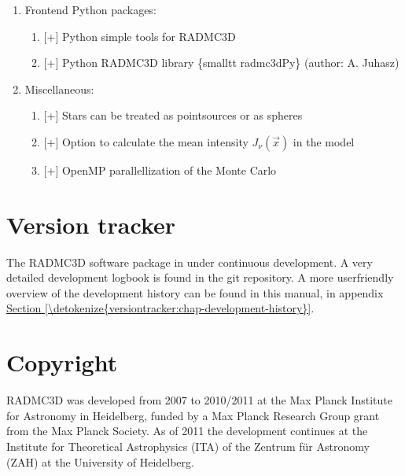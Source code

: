 \documentclass[letterpaper,10pt,english]{sphinxmanual}
\begin{document}
\begin{enumerate}
\begin{enumerate}
\item {} 
{[}+{]} Easy special\sphinxhyphen{}purpose compilations of the code (optional)

\end{enumerate}

\item {} 
Front\sphinxhyphen{}end Python packages:
\begin{enumerate}
%
\item {} 
{[}+{]} Python simple tools for RADMC\sphinxhyphen{}3D

\item {} 
{[}+{]} Python RADMC\sphinxhyphen{}3D library \{smalltt radmc3dPy\} (author: A. Juhasz)

\end{enumerate}

\item {} 
Miscellaneous:
\begin{enumerate}
%
\item {} 
{[}+{]} Stars can be treated as point\sphinxhyphen{}sources or as spheres

\item {} 
{[}+{]} Option to calculate the mean intensity \(J_\nu(\vec x)\) in the model

\item {} 
{[}+{]} OpenMP parallellization of the Monte Carlo

\end{enumerate}

\end{enumerate}


\section{Version tracker}
\label{\detokenize{introduction:version-tracker}}
The RADMC\sphinxhyphen{}3D software package in under continuous development. A very
detailed development log\sphinxhyphen{}book is found in the git repository.
A more user\sphinxhyphen{}friendly overview of the development history can be
found in this manual, in appendix \hyperref[\detokenize{versiontracker:chap-development-history}]{Section \ref{\detokenize{versiontracker:chap-development-history}}}.


\section{Copyright}
\label{\detokenize{introduction:copyright}}
RADMC\sphinxhyphen{}3D was developed from 2007 to 2010/2011 at the Max Planck Institute
for Astronomy in Heidelberg, funded by a Max Planck Research Group grant
from the Max Planck Society. As of 2011 the development continues at the
Institute for Theoretical Astrophysics (ITA) of the Zentrum für Astronomy
(ZAH) at the University of Heidelberg.
\end{document}
